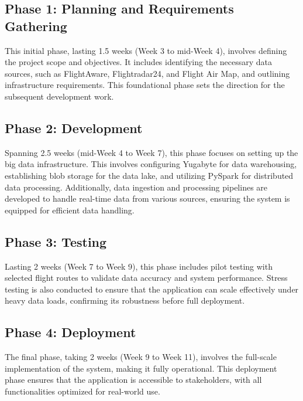 \documentclass[12pt,a4paper]{article}
\begin{document}
\subsection*{Phase 1: Planning and Requirements Gathering}
This initial phase, lasting 1.5 weeks (Week 3 to mid-Week 4), involves defining
the project scope and objectives. It includes identifying the necessary data
sources, such as FlightAware, Flightradar24, and Flight Air Map, and outlining
infrastructure requirements. This foundational phase sets the direction for the
subsequent development work.

\subsection*{Phase 2: Development}
Spanning 2.5 weeks (mid-Week 4 to Week 7), this phase focuses on setting up the
big data infrastructure. This involves configuring Yugabyte for data
warehousing, establishing blob storage for the data lake, and utilizing PySpark
for distributed data processing. Additionally, data ingestion and processing
pipelines are developed to handle real-time data from various sources, ensuring
the system is equipped for efficient data handling.
\subsection*{Phase 3: Testing}
Lasting 2 weeks (Week 7 to Week 9), this phase includes pilot testing with
selected flight routes to validate data accuracy and system performance. Stress
testing is also conducted to ensure that the application can scale effectively
under heavy data loads, confirming its robustness before full deployment.
\subsection*{Phase 4: Deployment}
The final phase, taking 2 weeks (Week 9 to Week 11), involves the full-scale
implementation of the system, making it fully operational. This deployment phase
ensures that the application is accessible to stakeholders, with all
functionalities optimized for real-world use.
\end{document}
